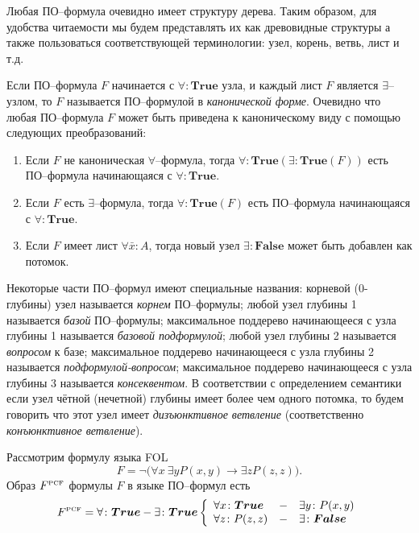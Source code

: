 Любая ПО--формула очевидно имеет структуру дерева. Таким образом, для удобства читаемости мы будем представлять их как древовидные структуры а также пользоваться соответствующей терминологии: узел, корень, ветвь, лист и т.д.

Если ПО--формула $F$ начинается с $\forall\colon\boldsymbol{True}$ узла, и каждый лист $F$ является $\exists$--узлом, то $F$ называется ПО--формулой в {\em канонической форме}.
Очевидно что любая ПО--формула $F$ может быть приведена к каноническому виду с помощью следующих преобразований:
\begin{enumerate}
\item Если $F$ не каноническая $\forall$--формула, тогда $\forall\colon \boldsymbol{True}\left(\exists\colon \boldsymbol{True}\left(F\right)\right)$ есть ПО--формула начинающаяся с $\forall\colon\boldsymbol{True}$.
\item Если $F$ есть $\exists$--формула, тогда $\forall\colon \boldsymbol{True}\left(F\right)$ есть ПО--формула начинающаяся с $\forall\colon\boldsymbol{True}$.
\item Если $F$ имеет лист $\forall \bar{x}\colon A$, тогда новый узел $\exists\colon\boldsymbol{False}$ может быть добавлен как потомок.
\end{enumerate}


Некоторые части ПО--формул имеют специальные названия: корневой (0-глубины) узел называется {\em корнем} ПО--формулы; любой узел глубины 1 называется {\em базой} ПО--формулы; максимальное поддерево начинающееся с узла глубины 1 называется {\em базовой подформулой}; любой узел глубины 2 называется {\em вопросом} к базе; максимальное поддерево начинающееся с узла глубины 2 называется {\em подформулой-вопросом}; максимальное поддерево начинающееся с узла глубины 3 называется {\em консеквентом}. В соответствии с определением семантики если узел чётной (нечетной) глубины имеет более чем одного потомка, то будем говорить что этот узел имеет {\em дизъюнктивное ветвление} (соответственно {\em конъюнктивное ветвление}).

\begin{example}
Рассмотрим формулу языка FOL
$$F= \neg\bigl(\forall x\:\exists y P(x,y)\rightarrow \exists z P(z,z)\bigr).$$
Образ $F^{\text{\tiny{PCF}}}$ формулы $F$ в языке ПО--формул есть
$$F^{\text{\tiny{PCF}}} = \forall\colon \boldsymbol{True}-\exists\colon\boldsymbol{True} \left\{
\begin{array}{lcl}
 \forall x\colon\boldsymbol{True} & - & \exists y\colon P(x,y) \\
 \forall z\colon P(z,z) & - & \exists\colon\boldsymbol{False}
\end{array}
\right.$$

\end{example}


